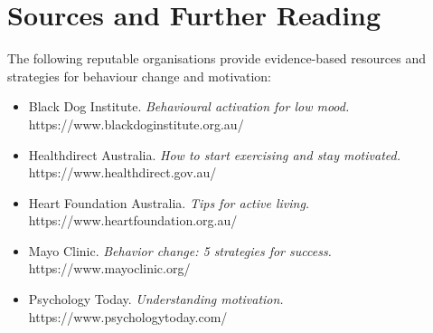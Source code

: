 \section*{Sources and Further Reading}
The following reputable organisations provide evidence-based resources and strategies for behaviour change and motivation:
\begin{itemize}
    \item Black Dog Institute. \textit{Behavioural activation for low mood.} https://www.blackdoginstitute.org.au/
    \item Healthdirect Australia. \textit{How to start exercising and stay motivated.} https://www.healthdirect.gov.au/
    \item Heart Foundation Australia. \textit{Tips for active living.} https://www.heartfoundation.org.au/
    \item Mayo Clinic. \textit{Behavior change: 5 strategies for success.} https://www.mayoclinic.org/
    \item Psychology Today. \textit{Understanding motivation.} https://www.psychologytoday.com/
\end{itemize}
